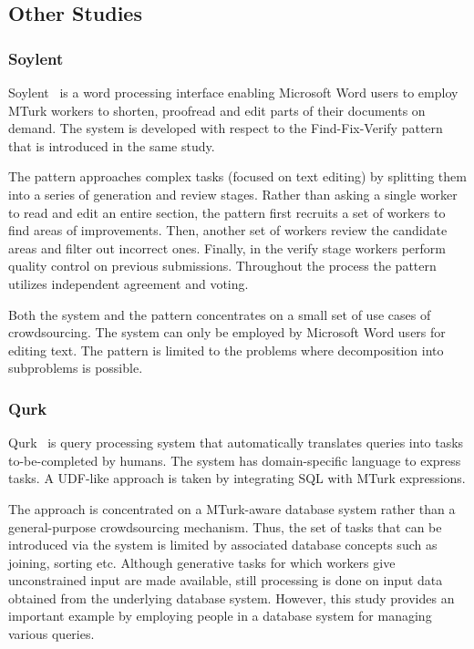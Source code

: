 \newpage

\subsection{Other Studies}
\subsubsection{Soylent}
Soylent~\cite{Bernstein2010} is a word processing interface enabling Microsoft Word 
users to employ MTurk workers to shorten, proofread and edit parts of their 
documents on demand. The system is developed with respect to the 
Find-Fix-Verify pattern that is introduced in the same study.

The pattern approaches complex tasks (focused on text editing) by splitting them 
into a series of generation and review stages. Rather than asking a single worker 
to read and edit an entire section, the pattern first recruits a set of workers to 
find areas of improvements. Then, another set of workers review the candidate 
areas and filter out incorrect ones. Finally, in the verify stage workers perform 
quality control on previous submissions. Throughout the process the pattern 
utilizes independent agreement and voting.

Both the system and the pattern concentrates on a small set of use cases of 
crowdsourcing. The system can only be employed by Microsoft Word users 
for editing text. The pattern is limited to the problems where decomposition 
into subproblems is possible.

\subsubsection{Qurk}
Qurk~\cite{Marcus2011, Marcus2011b} is query processing system that 
automatically translates queries into tasks to-be-completed by humans. The system 
has domain-specific language to express tasks. A UDF-like approach is taken 
by integrating SQL with MTurk expressions.

The approach is concentrated on a MTurk-aware database system rather than 
a general-purpose crowdsourcing mechanism. Thus, the set of tasks that can be 
introduced via the system is limited by associated database concepts such as 
joining, sorting etc. Although generative tasks for which workers give unconstrained 
input are made available, still processing is done on input data obtained from the 
underlying database system. However, this study provides an important example 
by employing people in a database system for managing various queries.

